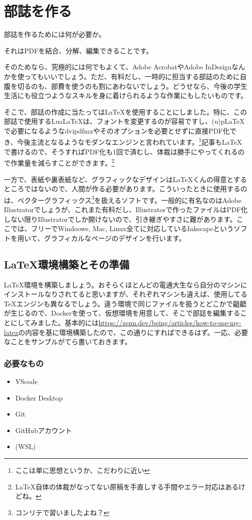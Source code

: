\documentclass[../super_nova_20yy]{subfiles}
\begin{document}
\chapter{部誌を作る} %
部誌を作るためには何が必要か。\par
それはPDFを結合、分解、編集できることです。\par
そのためなら、究極的には何でもよくて、Adobe AcrobatやAdobe InDesignなんかを使ってもいいでしょう。ただ、有料だし、一時的に担当する部誌のために自腹を切るのも、部費を使うのも割にあわないでしょう。どうせなら、今後の学生生活にも役立つようなスキルを身に着けられるような作業にもしたいものです。\par
そこで、部誌の作成に当たっては{\LaTeX}を使用することにしました。特に、この部誌で使用する{Lua\LaTeX}は、フォントを変更するのが容易ですし、{(u)p\LaTeX}で必要になるようなdvipdfmxやそのオプションを必要とせずに直接PDF化でき、今後主流となるようなモダンなエンジンと言われています。\footnote{ここは単に思想というか、こだわりに近い}記事も{\LaTeX}で書けるので、そうすればPDF化も1回で済むし、体裁は勝手にやってくれるので作業量を減らすことができます。\footnote{{\LaTeX}自体の体裁がなってない原稿を手直しする手間やエラー対応はあるけどね。}\par
一方で、表紙や裏表紙など、グラフィックなデザインは{\LaTeX}くんの得意とするところではないので、人間が作る必要があります。こういったときに使用するのは、ベクターグラフィックス\footnote{コンリテで習いましたよね？}を扱えるソフトです。一般的に有名なのはAdobe Illustratorでしょうが、これまた有料だし、Illustratorで作ったファイルはPDF化しない限りIllustratorでしか開けないので、引き継ぎやすさに難があります。ここでは、フリーでWindoows, Mac, Linux全てに対応しているInkscapeというソフトを用いて、グラフィカルなページのデザインを行います。
\section{\LaTeX 環境構築とその準備}
\LaTeX 環境を構築しましょう。おそらくほとんどの電通大生なら自分のマシンにインストールなりされてると思いますが、それぞれマシンも違えば、使用してる\TeX エンジンも異なるでしょう。違う環境で同じファイルを扱うとどこかで齟齬が生じるので、Dockerを使って、仮想環境を用意して、そこで部誌を編集することにしてみました。基本的には\url{https://zenn.dev/being/articles/how-to-use-my-latex}の内容を基に環境構築したので、この通りにすればできるはず。一応、必要なことをサンプルがてら書いておきます。

\subsection{必要なもの}
\begin{itemize}
  \item VScode
  \item Docker Desktop
  \item Git
  \item GitHubアカウント
  \item (WSL)
\end{itemize}
\end{document}
